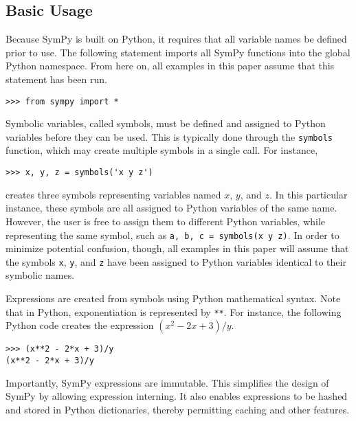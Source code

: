 
\subsection{Basic Usage}


Because SymPy is built on Python, it requires that all variable names be
defined prior to use. The following statement
imports all SymPy functions into the global Python namespace.
From here on, all examples in this paper assume that this statement has been
run.

\begin{verbatim}
>>> from sympy import *
\end{verbatim}

Symbolic variables, called symbols, must be defined and assigned to
Python variables before they can be used. This is typically done through the
\texttt{symbols} function, which may create multiple symbols in a single call. For
instance,
\begin{verbatim}
>>> x, y, z = symbols('x y z')
\end{verbatim}
creates three symbols representing variables named $x$, $y$, and $z$. In this
particular instance, these symbols are all assigned to Python variables of the
same name. However, the user is free to assign them to different
Python variables, while representing the same symbol, such as
\texttt{a, b, c = symbols(\textquotesingle{}x y z\textquotesingle{})}.
In order to minimize potential confusion, though, all examples in this paper will
assume that
the symbols \verb|x|, \verb|y|, and \verb|z| have been assigned to Python variables
identical to their symbolic names.

Expressions are created from symbols using Python mathematical syntax. Note
that in Python, exponentiation is represented by \verb|**|. For instance, the
following Python code creates the expression $(x^2 - 2x + 3)/y$.

\begin{verbatim}
>>> (x**2 - 2*x + 3)/y
(x**2 - 2*x + 3)/y
\end{verbatim}

Importantly, SymPy expressions are immutable. This simplifies the design of
SymPy by allowing expression interning. It also enables expressions to be
hashed and stored in Python dictionaries, thereby permitting caching and
other features.


